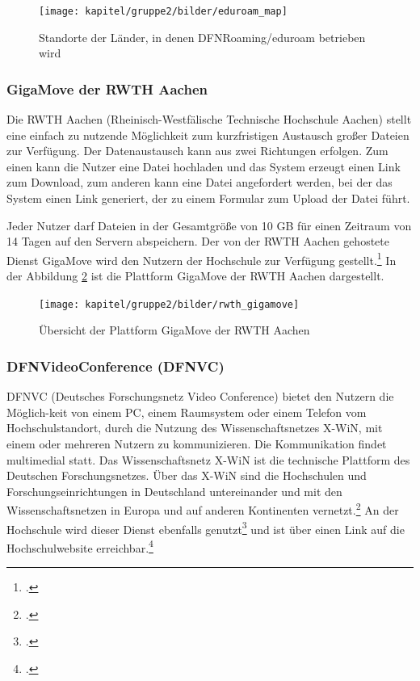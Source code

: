 \begin{figure}[h!]
	\centering
	\texttt{[image: kapitel/gruppe2/bilder/eduroam\_map]}
	\caption{Standorte der Länder, in denen DFNRoaming/eduroam betrieben wird\protect\footnotemark}
	\label{fig_map_eduroam}
\end{figure}

\subsubsection{GigaMove der RWTH Aachen}
\label{gigamove_rwth_aachen}
Die RWTH Aachen (Rheinisch-Westfälische Technische Hochschule Aachen) stellt eine einfach zu nutzende Möglichkeit zum kurzfristigen Austausch großer Dateien zur Verfügung. Der Datenaustausch kann aus zwei Richtungen erfolgen. Zum einen kann die Nutzer eine Datei hochladen und das System erzeugt einen Link zum Download, zum anderen kann eine Datei angefordert werden, bei der das System einen Link generiert, der zu einem Formular zum Upload der Datei führt.

Jeder Nutzer darf Dateien in der Gesamtgröße von 10 GB für einen Zeitraum von 14 Tagen auf den Servern abspeichern. Der von der RWTH Aachen gehostete Dienst GigaMove wird den Nutzern der Hochschule zur Verfügung gestellt.\footcite{hsel_servicelinks_2015} 
\clearpage
In der Abbildung \ref{fig_rwth_gigamove} ist die Plattform GigaMove der RWTH Aachen dargestellt.

\begin{figure}[h]
	\centering
	\texttt{[image: kapitel/gruppe2/bilder/rwth\_gigamove]}
	\caption{Übersicht der Plattform GigaMove der RWTH Aachen \protect\footnotemark}
	\label{fig_rwth_gigamove}
\end{figure}

\subsubsection{DFNVideoConference (DFNVC)}
DFNVC (Deutsches Forschungsnetz Video Conference) bietet den Nutzern die Möglich-keit von einem 
PC, einem Raumsystem oder einem Telefon vom Hochschulstandort, durch die Nutzung des 
Wissenschaftsnetzes X-WiN, mit einem oder mehreren Nutzern zu kommunizieren. Die Kommunikation 
findet multimedial statt. Das Wissenschaftsnetz X-WiN ist die technische Plattform des Deutschen 
Forschungsnetzes. Über das X-WiN sind die Hochschulen und Forschungseinrichtungen in Deutschland 
untereinander und mit den Wissenschaftsnetzen in Europa und auf anderen Kontinenten 
vernetzt.\footcite[Vgl.][]{dfn_DFNVideoConference_2014} An der Hochschule wird dieser Dienst 
ebenfalls genutzt\footcite{hsel_shibboleth_auth_2015} und ist über einen Link auf die 
Hochschulwebsite erreichbar.\footcite{dfn_DFNVC_Webkonferenzen_2015}

